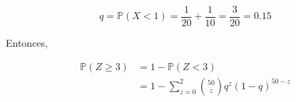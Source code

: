\begin{solution}
$$q=\mathbb{P}(X<1)=\dfrac{1}{20}+\dfrac{1}{10}=\dfrac{3}{20}=0.15$$

Entonces,

\begin{align*}
    \mathbb{P}(Z\geq 3)&=1-\mathbb{P}(Z<3)\\
    &= 1- \sum_{z=0}^{2}\binom{50}{z}q^z (1-q)^{50-z}
\end{align*}
\end{solution}
